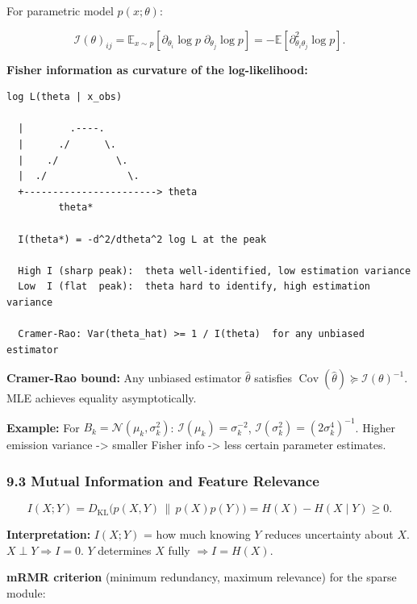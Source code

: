 \documentclass[11pt,a4paper]{article}
\begin{document}
\begin{tcolorbox}[colback=defbg!60,colframe=optblue,fonttitle=\bfseries\sffamily,title={\textsf{\textbf{Definition}} — Definition — Fisher Information Matrix},breakable]
For parametric model $p(x;\theta)$:

$$\mathcal{I}(\theta)_{ij}
= \mathbb{E}_{x\sim p}\!\left[\partial_{\theta_i}\log p\;\partial_{\theta_j}\log p\right]
= -\mathbb{E}\!\left[\partial^2_{\theta_i\theta_j}\log p\right].$$
\end{tcolorbox}

\textbf{Fisher information as curvature of the log-likelihood:}

\begin{verbatim}
log L(theta | x_obs)

  |        .----.
  |      ./      \.
  |    ./          \.
  |  ./              \.
  +-----------------------> theta
         theta*

  I(theta*) = -d^2/dtheta^2 log L at the peak

  High I (sharp peak):  theta well-identified, low estimation variance
  Low  I (flat  peak):  theta hard to identify, high estimation variance

  Cramer-Rao: Var(theta_hat) >= 1 / I(theta)  for any unbiased estimator
\end{verbatim}

\textbf{Cramer-Rao bound:} Any unbiased estimator \(\hat\theta\) satisfies \(\operatorname{Cov}(\hat\theta) \succeq \mathcal{I}(\theta)^{-1}\). MLE achieves equality asymptotically.

\textbf{Example:} For \(B_k = \mathcal{N}(\mu_k,\sigma_k^2)\): \(\mathcal{I}(\mu_k)=\sigma_k^{-2}\), \(\mathcal{I}(\sigma_k^2)=(2\sigma_k^4)^{-1}\). Higher emission variance -\textgreater{} smaller Fisher info -\textgreater{} less certain parameter estimates.

\subsubsection{9.3 Mutual Information and Feature Relevance}\label{mutual-information-and-feature-relevance}

\[I(X;Y) = D_{\mathrm{KL}}\bigl(p(X,Y)\,\|\,p(X)p(Y)\bigr) = H(X) - H(X\mid Y) \ge 0.\]

\textbf{Interpretation:} \(I(X;Y)\) = how much knowing \(Y\) reduces uncertainty about \(X\). \(X \perp Y \Rightarrow I=0\). \(Y\) determines \(X\) fully \(\Rightarrow I = H(X)\).

\textbf{mRMR criterion} (minimum redundancy, maximum relevance) for the sparse module:
\end{document}
